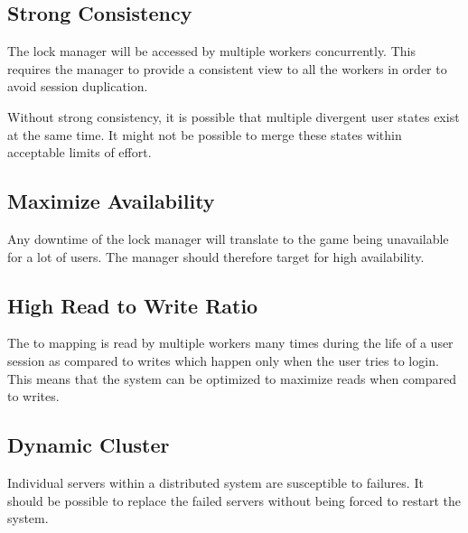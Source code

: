 \subsection{Strong Consistency}


The lock manager will be accessed by multiple workers concurrently. This
requires the manager to provide a consistent view to all the workers in
order to avoid session duplication.

Without strong consistency, it is possible that multiple divergent user states
exist at the same time. It might not be possible to merge these states within
acceptable limits of effort.

\subsection{Maximize Availability}


Any downtime of the lock manager will translate to the game being unavailable
for a lot of users. The manager should therefore target for high availability.

\subsection{High Read to Write Ratio}
\label{section:req.read.write.ratio}


The  to  mapping is read by multiple workers many times
during the life
of a user session as compared to writes which happen only when the user tries
to login. This means that the system can be optimized to maximize reads when
compared to writes.

\subsection{Dynamic Cluster}
\label{section:req.dynamic.cluster}


Individual servers within a distributed system are susceptible to failures.
It should be possible to replace the failed servers without being forced
to restart the system.

